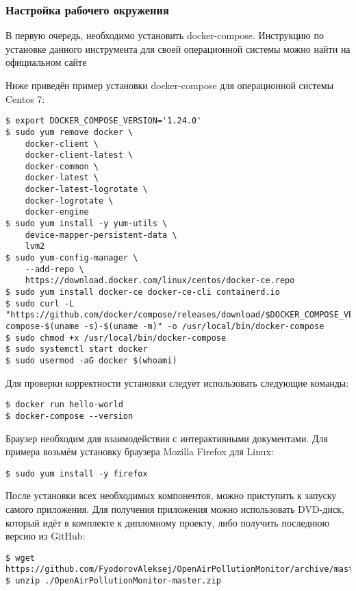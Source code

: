 \subsubsection{Настройка рабочего окружения}

В первую очередь, необходимо установить docker-compose.
Инструкцию по установке данного инструмента для своей операционной системы можно найти на официальном сайте ~\cite{docker_compose_install_site}

Ниже приведён пример установки docker-compose для операционной системы Centos 7:

\begin{lstlisting}
$ export DOCKER_COMPOSE_VERSION='1.24.0'
$ sudo yum remove docker \
    docker-client \
    docker-client-latest \
    docker-common \
    docker-latest \
    docker-latest-logrotate \
    docker-logrotate \
    docker-engine
$ sudo yum install -y yum-utils \
    device-mapper-persistent-data \
    lvm2
$ sudo yum-config-manager \
    --add-repo \
    https://download.docker.com/linux/centos/docker-ce.repo
$ sudo yum install docker-ce docker-ce-cli containerd.io
$ sudo curl -L "https://github.com/docker/compose/releases/download/$DOCKER_COMPOSE_VERSION/docker-compose-$(uname -s)-$(uname -m)" -o /usr/local/bin/docker-compose
$ sudo chmod +x /usr/local/bin/docker-compose
$ sudo systemctl start docker
$ sudo usermod -aG docker $(whoami)
\end{lstlisting}

Для проверки корректности установки следует использовать следующие команды:

\begin{lstlisting}
$ docker run hello-world
$ docker-compose --version
\end{lstlisting}

Браузер необходим для взаимодействия с интерактивными документами.
Для примера возьмём установку браузера Mozilla Firefox для Linux:

\begin{lstlisting}
$ sudo yum install -y firefox    
\end{lstlisting}


После установки всех необходимых компонентов, можно приступить к запуску самого приложения.
Для получения приложения можно использовать DVD-диск, который идёт в комплекте к дипломному проекту, либо получить последнюю версию из GitHub:

\begin{lstlisting}
$ wget https://github.com/FyodorovAleksej/OpenAirPollutionMonitor/archive/master.zip
$ unzip ./OpenAirPollutionMonitor-master.zip
\end{lstlisting}

